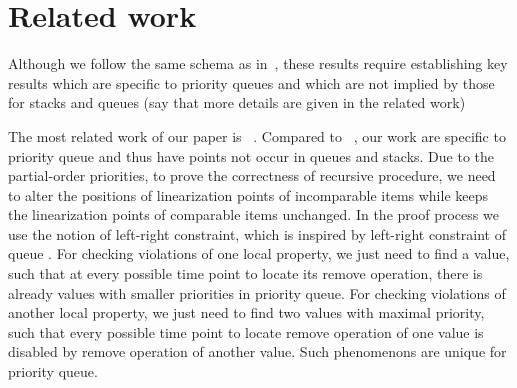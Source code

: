 \section{Related work}

Although we follow the same schema as in~\cite{DBLP:conf/icalp/BouajjaniEEH15}, these results require establishing key results which are specific to priority queues and which are not implied by those for stacks and queues (say that more details are given in the related work)

\noindent The most related work of our paper is ~\cite{DBLP:conf/icalp/BouajjaniEEH15}. Compared to ~\cite{DBLP:conf/icalp/BouajjaniEEH15}, our work are specific to priority queue and thus have points not occur in queues and stacks. Due to the partial-order priorities, to prove the correctness of recursive procedure, we need to alter the positions of linearization points of incomparable items while keeps the linearization points of comparable items unchanged. {\color {blue}In the proof process we use the notion of left-right constraint, which is inspired by left-right constraint of queue \cite{Bouajjani:2015}.} For checking violations of one local property, we just need to find a value, such that at every possible time point to locate its remove operation, there is already values with smaller priorities in priority queue. For checking violations of another local property, we just need to find two values with maximal priority, such that every possible time point to locate remove operation of one value is disabled by remove operation of another value. Such phenomenons are unique for priority queue.
